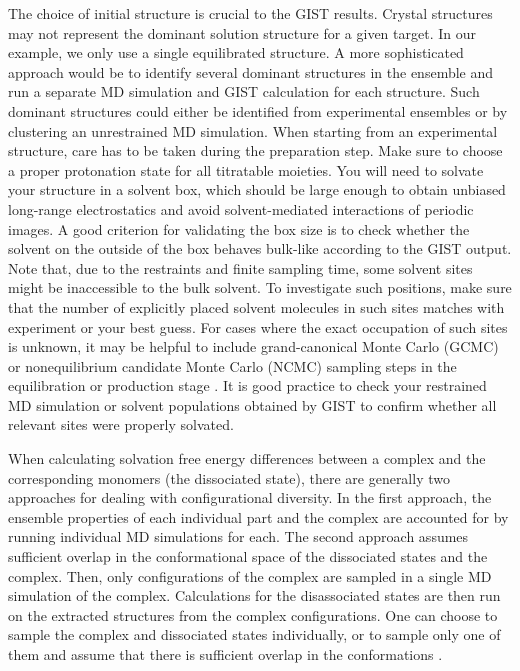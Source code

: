 \documentclass[9pt,tutorial]{livecoms}
\begin{document}
The choice of initial structure is crucial to the GIST results.
Crystal structures may not represent the dominant solution structure for a given target.
In our example, we only use a single equilibrated structure.
A more sophisticated approach would be to identify several dominant structures in the ensemble and run a separate MD simulation and GIST calculation for each structure. 
Such dominant structures could either be identified from experimental ensembles or by clustering an unrestrained MD simulation. 
When starting from an experimental structure, care has to be taken during the preparation step.
Make sure to choose a proper protonation state for all titratable moieties.
You will need to solvate your structure in a solvent box, which should be large enough to obtain unbiased long-range electrostatics and avoid solvent-mediated interactions of periodic images.
A good criterion for validating the box size is to check whether the solvent on the outside of the box behaves bulk-like according to the GIST output.
Note that, due to the restraints and finite sampling time, some solvent sites might be inaccessible to the bulk solvent.
To investigate such positions, make sure that the number of explicitly placed solvent molecules in such sites matches with experiment or your best guess. 
For cases where the exact occupation of such sites is unknown, it may be helpful to include grand-canonical Monte Carlo (GCMC) or nonequilibrium candidate Monte Carlo (NCMC) sampling steps in the equilibration or production stage \cite{Ge-GCMC2022,Melling-NCMC2023}.
It is good practice to check your restrained MD simulation or solvent populations obtained by GIST to confirm whether all relevant sites were properly solvated.

When calculating solvation free energy differences between a complex and the corresponding monomers (the dissociated state), there are generally two approaches for dealing with configurational diversity. 
In the first approach, the ensemble properties of each individual part and the complex are accounted for by running individual MD simulations for each.
The second approach assumes sufficient overlap in the conformational space of the dissociated states and the complex. 
Then, only configurations of the complex are sampled in a single MD simulation of the complex. 
Calculations for the disassociated states are then run on the extracted structures from the complex configurations.
One can choose to sample the complex and dissociated states individually, or to sample only one of them and assume that there is sufficient overlap in the conformations \cite{Genheden-EndState2012,Wang-MMPBSA2019}. 
\end{document}
